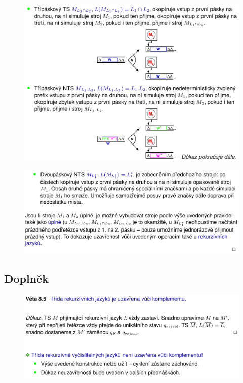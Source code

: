 \begin{figure}[H]
    \centering
    \includegraphics[width=1\linewidth]{uzaverove_vlasnosti_L0_02.pdf}
\end{figure}

\begin{figure}[H]
    \centering
    \includegraphics[width=1\linewidth]{uzaverove_vlasnosti_L0_03.pdf}
\end{figure}

\subsection{Doplněk}

\begin{figure}[H]
    \centering
    \includegraphics[width=1\linewidth]{uzaverove_vlasnosti_L0_04.pdf}
\end{figure}

